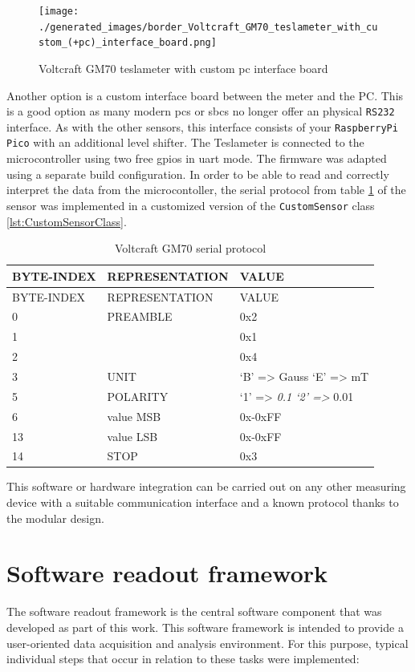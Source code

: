 \begin{figure}
\centering
\texttt{[image: ./generated\_images/border\_Voltcraft\_GM70\_teslameter\_with\_custom\_(+pc)\_interface\_board.png]}
\caption{Voltcraft GM70 teslameter with custom \gls{pc} interface board
\label{Voltcraft_GM70_teslameter_with_custom_(+pc)_interface_board.png}}
\end{figure}

Another option is a custom interface board between the meter and the PC.
This is a good option as many modern \gls{pc}s or \gls{sbc}s no longer
offer an physical \passthrough{\lstinline!RS232!} interface. As with the
other sensors, this interface consists of your
\passthrough{\lstinline!RaspberryPi Pico!} with an additional level
shifter. The Teslameter is connected to the microcontroller using two
free \gls{gpio}s in \gls{uart} mode. The firmware was adapted using a
separate build configuration. In order to be able to read and correctly
interpret the data from the microcontoller, the serial protocol from
table \ref{Voltcraft_GM70_serial_protocol.csv} of the sensor was
implemented in a customized version of the
\passthrough{\lstinline!CustomSensor!} class
\ref{lst:CustomSensorClass}.

\begin{longtable}[]{@{}lll@{}}
\caption{Voltcraft GM70 serial protocol
\label{Voltcraft_GM70_serial_protocol.csv}}\tabularnewline
\toprule
BYTE-INDEX & REPRESENTATION & VALUE\tabularnewline
\midrule
\endfirsthead
\toprule
BYTE-INDEX & REPRESENTATION & VALUE\tabularnewline
\midrule
\endhead
0 & PREAMBLE & 0x2\tabularnewline
1 & & 0x1\tabularnewline
2 & & 0x4\tabularnewline
3 & UNIT & `B' =\textgreater{} Gauss `E' =\textgreater{}
mT\tabularnewline
5 & POLARITY & `1' =\textgreater{} \emph{0.1 `2' =\textgreater{}
}0.01\tabularnewline
6 & value MSB & 0x-0xFF\tabularnewline
13 & value LSB & 0x-0xFF\tabularnewline
14 & STOP & 0x3\tabularnewline
\bottomrule
\end{longtable}

This software or hardware integration can be carried out on any other
measuring device with a suitable communication interface and a known
protocol thanks to the modular design.

\hypertarget{software-readout-framework}{%
\chapter{Software readout framework}\label{software-readout-framework}}

The software readout framework is the central software component that
was developed as part of this work. This software framework is intended
to provide a user-oriented data acquisition and analysis environment.
For this purpose, typical individual steps that occur in relation to
these tasks were implemented:

